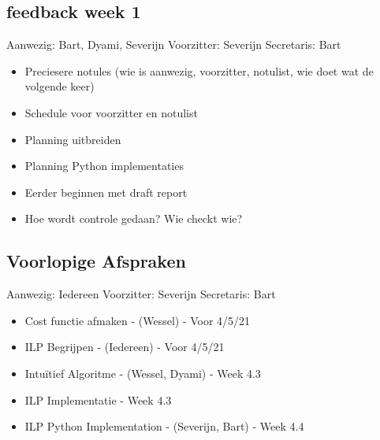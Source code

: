 \documentclass{article}
\begin{document}
\subsection*{feedback week 1}
Aanwezig: Bart, Dyami, Severijn \newline
Voorzitter: Severijn \newline
Secretaris: Bart \newline
\begin{itemize}
    \item Preciesere notules (wie is aanwezig, voorzitter, notulist, wie doet wat de volgende keer)
    \item Schedule voor voorzitter en notulist
    \item Planning uitbreiden
    \item Planning Python implementaties
    \item Eerder beginnen met draft report
    \item Hoe wordt controle gedaan? Wie checkt wie?
\end{itemize}

\subsection*{Voorlopige Afspraken}
Aanwezig: Iedereen \newline
Voorzitter: Severijn \newline
Secretaris: Bart \newline
\begin{itemize}
    \item Cost functie afmaken - (Wessel) - Voor 4/5/21
    \item ILP Begrijpen - (Iedereen) - Voor 4/5/21    
    \item Intuïtief Algoritme - (Wessel, Dyami) - Week 4.3
    \item ILP Implementatie -  Week 4.3
    \item ILP Python Implementation - (Severijn, Bart) - Week 4.4
\end{itemize}
\end{document}
